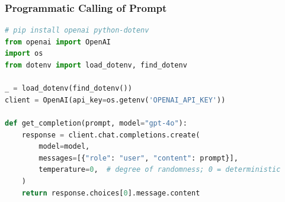 







\begin{frame}[fragile]\frametitle{Programmatic Calling of Prompt}

\begin{lstlisting}[language=Python]
# pip install openai python-dotenv
from openai import OpenAI
import os
from dotenv import load_dotenv, find_dotenv

_ = load_dotenv(find_dotenv())
client = OpenAI(api_key=os.getenv('OPENAI_API_KEY'))

def get_completion(prompt, model="gpt-4o"):
    response = client.chat.completions.create(
        model=model,
        messages=[{"role": "user", "content": prompt}],
        temperature=0,  # degree of randomness; 0 = deterministic
    )
    return response.choices[0].message.content
\end{lstlisting}
		
\end{frame}

